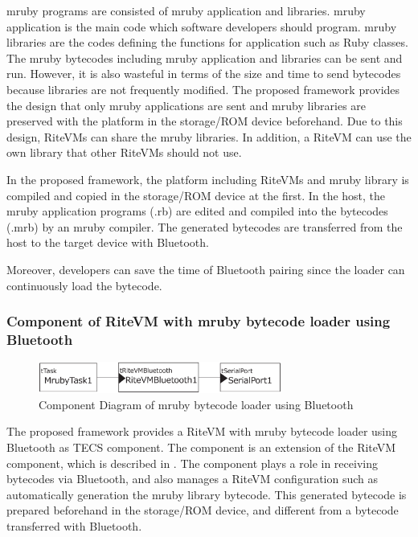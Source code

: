 \documentclass{sig-alternate-05-2015}
\begin{document}
mruby programs are consisted of mruby application and libraries.
mruby application is the main code which software developers should program.
mruby libraries are the codes defining the functions for application such as Ruby classes. 
The mruby bytecodes including mruby application and libraries can be sent and run.
However, it is also wasteful in terms of the size and time to send bytecodes because libraries are not frequently modified. 
The proposed framework provides the design that only mruby applications are sent and mruby libraries are preserved with the platform in the storage/ROM device beforehand.
Due to this design, RiteVMs can share the mruby libraries.
In addition, a RiteVM can use the own library that other RiteVMs should not use.

In the proposed framework, the platform including RiteVMs and mruby library is compiled and copied in the storage/ROM device at the first.
In the host, the mruby application programs (.rb) are edited and compiled into the bytecodes (.mrb) by an mruby compiler.
The generated bytecodes are transferred from the host to the target device with Bluetooth.

Moreover, developers can save the time of Bluetooth pairing since the loader can continuously load the bytecode.


\subsubsection{Component of RiteVM with mruby bytecode loader using Bluetooth}
\begin{figure}[t]
    \centering
    \includegraphics[width=8cm,clip]{figure/component_bluetooth.eps}
    \caption{Component Diagram of mruby bytecode loader using Bluetooth}
    \label{fig:component_bluetooth}
\end{figure}
The proposed framework provides a RiteVM with mruby bytecode loader using Bluetooth as TECS component.
The component is an extension of the RiteVM component, which is described in \cite{par:mrubyonTECS}.
The component plays a role in receiving bytecodes via Bluetooth, and also manages a RiteVM configuration such as automatically generation the mruby library bytecode.
This generated bytecode is prepared beforehand in the storage/ROM device, and different from a bytecode transferred with Bluetooth.
\end{document}
